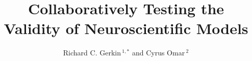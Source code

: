 \documentclass{frontiersSCNS}
\def\firstAuthorLast{Sample {et~al.}} %
\def\Authors{Richard C. Gerkin\,$^{1,*}$ and Cyrus Omar\,$^{2}$}
\begin{document}
\onecolumn
{}

\title[Running Title]{Collaboratively Testing the Validity of Neuroscientific Models}
\author[\firstAuthorLast ]{\Authors}
\address{}
\correspondance{}
\extraAuth{}%

\maketitle
\end{document}
